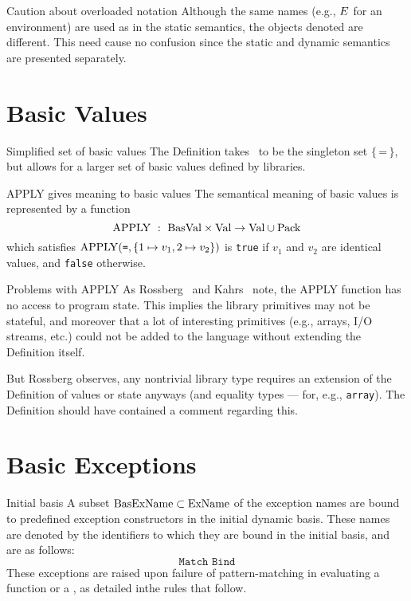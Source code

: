 \begin{remark}{Caution about overloaded notation}
Although the same names (e.g., $E$ for an environment) are used
as in the static semantics, the objects denoted are different.
This need cause no confusion since the static and dynamic semantics are
presented separately. 
\end{remark}

\section{Basic Values}

\begin{clause}{Simplified set of basic values}
The Definition takes \BasVal\ to be the singleton set
$\{\,\texttt{=}\,\}$, but allows for a larger set of basic values
defined by libraries.
\end{clause}

\begin{clause}{APPLY gives meaning to basic values}
The semantical meaning of basic values is represented by a function
\begin{equation*}
\APPLY\ :\ \BasVal\times\Val\to\Val\cup\Pack
\end{equation*}
which satisfies ${\rm APPLY}(\texttt{=},\{1\mapsto v_{1},2\mapsto v_{2}\})$
is \texttt{true} if $v_{1}$ and $v_{2}$ are identical values, and
\texttt{false} otherwise.
\end{clause}

\begin{remark}{Problems with APPLY}
As Rossberg~\cite[]{rossbert2018defects} and
Kahrs~\cite[\oldS{}--3]{kahrs1993mistakes} note, the APPLY function has no access to
program state. This implies the library primitives may not be stateful,
and moreover that a lot of interesting primitives (e.g., arrays, I/O
streams, etc.) could not be added to the language without extending the
Definition itself.

But Rossberg observes, any nontrivial library type requires an extension
of the Definition of values or state anyways (and equality types ---
for, e.g., \texttt{array}). The Definition should have contained a
comment regarding this.
\end{remark}

\section{Basic Exceptions}

\begin{clause}{Initial basis}
A subset ${\rm BasExName}\subset{\rm ExName}$ of the exception names are bound to
predefined exception constructors in the initial dynamic basis. These
names are denoted by the identifiers to which they are bound in the
initial basis, and are as follows:
\begin{equation*}
\texttt{Match\ \ Bind}
\end{equation*}
These exceptions are raised upon failure of pattern-matching in
evaluating a function or a \valbind, as detailed inthe rules that follow.
\end{clause}

